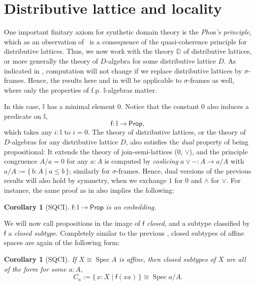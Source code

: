 \documentclass[12pt]{amsart}
\newtheorem{corollary}[theorem]{Corollary}
\theoremstyle{definition}
\newcommand{\mbb}[1]{\mathbb{#1}}
\newcommand{\I}{\mbb I}
\newcommand{\ms}[1]{\mathsf{#1}}
\newcommand{\scomp}[2]{\{\,#1\mid#2\,\}}
\newcommand{\pp}{\ms{Prop}}
\newcommand{\spec}{\operatorname{Spec}}
\begin{document}
\section{Distributive lattice and locality}\label{sec:locality}

One important finitary axiom for synthetic domain theory is the \emph{Phoa's principle}, which as an observation of~\cite{gratzer2024directed} is a consequence of the quasi-coherence principle for distributive lattices. Thus, we now work with the theory $\mbb D$ of distributive lattices, or more generally the theory of $D$-algebra for some distributive lattice $D$. As indicated in , computation will not change if we replace distributive lattices by $\sigma$-frames. Hence, the results here and in  will be applicable to $\sigma$-frames as well, where only the properties of f.p. $\I$-algebras matter.

In this case, $\I$ has a minimal element $0$. Notice that the constant $0$ also induces a predicate on $\I$,
\[ \ms f : \I \to \pp, \]
which takes any $i : \I$ to $i = 0$. The theory of distributive lattices, or the theory of $D$-algebras for any distributive lattice $D$, also satisfies the \emph{dual} property of being propositional: It extends the theory of join-semi-lattices ($0$, $\vee$), and the principle congruence $A/a = 0$ for any $a:A$ is computed by \emph{coslicing} $a \vee - : A \to a/A$ with $a/A := \scomp{b:A}{a \le b}$; similarly for $\sigma$-frames. Hence, dual versions of the previous results will also hold by symmetry, when we exchange $1$ for $0$ and $\wedge$ for $\vee$. For instance, the same proof as in  also implies the following:

\begin{corollary}[SQCI]
  $\ms f : \I \to \pp$ is an embedding.
\end{corollary}

We will now call propositions in the image of $\ms f$ \emph{closed}, and a subtype classified by $\ms f$ a \emph{closed subtype}. Completely similar to the previous , closed subtypes of affine spaces are again of the following form:

\begin{corollary}[SQCI]\label{cor:closedaffinealgebra}
  If $X \cong \spec A$ is affine, then closed subtypes of $X$ are all of the form for some $a:A$,
  \[ C_a := \scomp{x : X}{\ms f(xa)} \cong \spec a/A. \]
\end{corollary}
\end{document}
